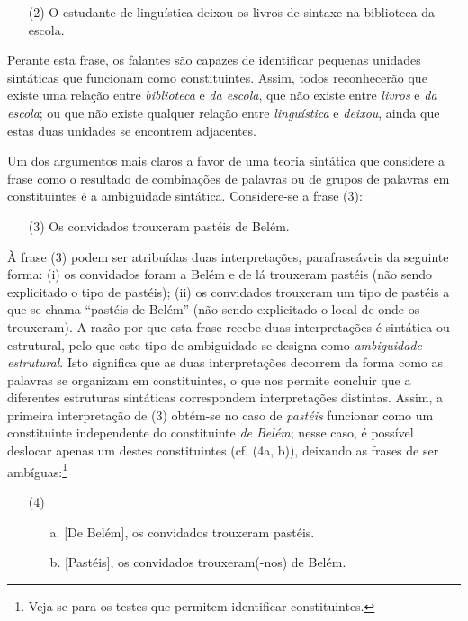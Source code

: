 \documentclass[output=paper,colorlinks,citecolor=brown,booklanguage=portuguese]{langscibook}
\begin{document}
\begin{enumerate}[align=left]
    \item [(2)] O estudante de linguística deixou os livros de sintaxe na biblioteca da escola.
\end{enumerate}

Perante esta frase, os falantes são capazes de identificar pequenas unidades sintáticas que funcionam como constituintes. Assim, todos reconhecerão que existe uma relação entre \emph{biblioteca} e \emph{da escola}, que não existe entre \emph{livros} e \emph{da escola}; ou que não existe qualquer relação entre \emph{linguística} e \emph{deixou}, ainda que estas duas unidades se encontrem adjacentes. 

Um dos argumentos mais claros a favor de uma teoria sintática que considere a frase como o resultado de combinações de palavras ou de grupos de palavras em constituintes é a ambiguidade sintática. Considere-se a frase (3):

\begin{enumerate}[leftmargin=*]
    \item [(3)] Os convidados trouxeram pastéis de Belém.
\end{enumerate}

À frase (3) podem ser atribuídas duas interpretações, parafraseáveis da seguinte forma: (i) os convidados foram a Belém e de lá trouxeram pastéis (não sendo explicitado o tipo de pastéis); (ii) os convidados trouxeram um tipo de pastéis a que se chama “pastéis de Belém” (não sendo explicitado o local de onde os trouxeram). A razão por que esta frase recebe duas interpretações é sintática ou estrutural, pelo que este tipo de ambiguidade se designa como \emph{ambiguidade estrutural}. Isto significa que as duas interpretações decorrem da forma como as palavras se organizam em constituintes, o que nos permite concluir que a diferentes estruturas sintáticas correspondem interpretações distintas. Assim, a primeira interpretação de (3) obtém-se no caso de \emph{pastéis} funcionar como um constituinte independente do constituinte \emph{de Belém}; nesse caso, é possível deslocar apenas um destes constituintes (cf. (4a, b)), deixando as frases de ser ambíguas:\footnote{Veja-se \citet{Duarte2000} para os testes que permitem identificar constituintes.}

\begin{enumerate}[align=left]
    \item [(4)]
    \begin{enumerate}
        \item [a.] [De Belém], os convidados trouxeram pastéis.
\item [b.] [Pastéis], os convidados trouxeram(-nos) de Belém.
\end{enumerate}
\end{enumerate}
\end{document}
